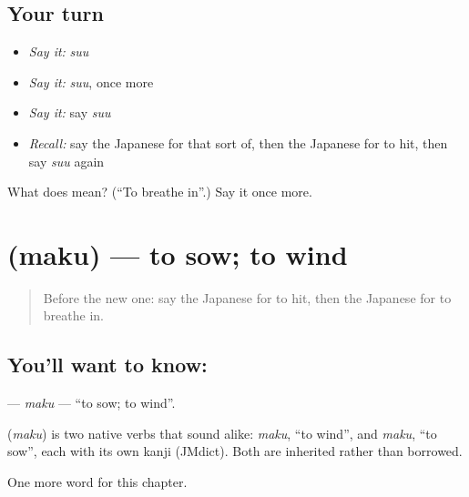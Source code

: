 \subsection*{Your turn}
\begin{itemize}
\raggedright
  \item \emph{Say it:} \emph{suu}
  \item \emph{Say it:} \emph{suu}, once more
  \item \emph{Say it:} say \emph{suu}
  \item \emph{Recall:} say the Japanese for that sort of, then the Japanese for to hit, then say \emph{suu} again
\end{itemize}

\begin{tcolorbox}[breakable,colback=teal!4,colframe=teal!35!black,title={Before you move on}]
What does  mean? (\textquotedblleft{}To breathe in\textquotedblright{}.) Say it once more.
\end{tcolorbox}
\section[\texorpdfstring{\ja{まく} (maku)}{まく (maku)}]{ (maku) — to sow; to wind}

\label{lesson:JA-C85-maku}



\begin{quote}
Before the new one: say the Japanese for to hit, then the Japanese for to breathe in.
\end{quote}

\subsection*{You'll want to know: }
\textbf{} — \emph{maku} — \textquotedblleft{}to sow; to wind\textquotedblright{}.

\begin{cousinweb}
\textbf{} (\emph{maku}) is two native verbs that sound alike: \emph{maku}, \textquotedblleft{}to wind\textquotedblright{}, and \emph{maku}, \textquotedblleft{}to sow\textquotedblright{}, each with its own kanji (JMdict). Both are inherited rather than borrowed.
\end{cousinweb}

\begin{grammarlens}[title={What you've built}]
One more word for this chapter.
\end{grammarlens}

